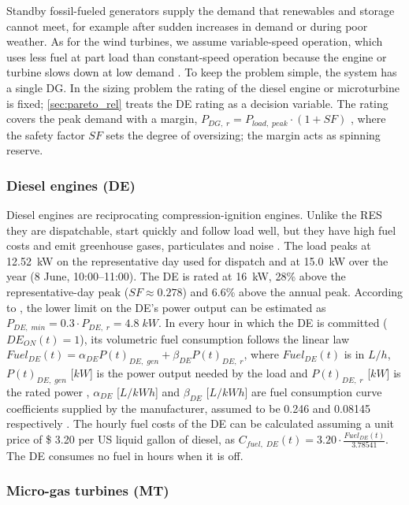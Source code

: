 \documentclass[final,3p,times]{elsarticle}
\begin{document}
Standby fossil-fueled generators supply the demand that renewables and storage cannot meet, for example after sudden increases in demand or during poor weather. As for the wind turbines, we assume variable-speed operation, which uses less fuel at part load than constant-speed operation because the engine or turbine slows down at low demand \cite{seeling1997}. To keep the problem simple, the system has a single DG. In the sizing problem the rating of the diesel engine or microturbine is fixed; \cref{sec:pareto_rel} treats the DE rating as a decision variable. The rating covers the peak demand with a margin, $P_{DG,\;r} = P_{load,\;peak} \cdot (1 + SF)$ \cite{ghasemi2013}, where the safety factor $SF$ sets the degree of oversizing; the margin acts as spinning reserve.

\subsubsection{Diesel engines (DE)}

Diesel engines are reciprocating compression-ignition engines. Unlike the RES they are dispatchable, start quickly and follow load well, but they have high fuel costs and emit greenhouse gases, particulates and noise \cite{mg_review}. The load peaks at 12.52~kW on the representative day used for dispatch and at 15.0~kW over the year (8 June, 10:00--11:00). The DE is rated at 16~kW, 28\% above the representative-day peak ($SF \approx 0.278$) and 6.6\% above the annual peak. According to \cite{fathima2015}, the lower limit on the DE's power output can be estimated as $P_{DE,\;min} = 0.3 \cdot P_{DE,\; r} = 4.8 \; kW$. In every hour in which the DE is committed ($DE_{ON}(t) = 1$), its volumetric fuel consumption follows the linear law $Fuel_{DE}(t) = \alpha_{DE} P(t)_{DE,\;gen} + \beta_{DE} P(t)_{DE,\;r}$, where $Fuel_{DE}(t)$ is in $L/h$, $P(t)_{DE,\;gen}$ [$kW$] is the power output needed by the load and $P(t)_{DE,\;r}$ [$kW$] is the rated power \cite{kaabeche2014}, $\alpha_{DE}$ [$L/kWh$] and $\beta_{DE}$ [$L/kWh$] are fuel consumption curve coefficients supplied by the manufacturer, assumed to be 0.246 and 0.08145 respectively \cite{kaabeche2014}. The hourly fuel costs of the DE can be calculated assuming a unit price of \$ 3.20 per US liquid gallon of diesel, as $C_{fuel,\; DE}(t) = 3.20 \cdot \frac{Fuel_{DE}(t)}{3.78541}$. The DE consumes no fuel in hours when it is off.

\subsubsection{Micro-gas turbines (MT)}
\end{document}
